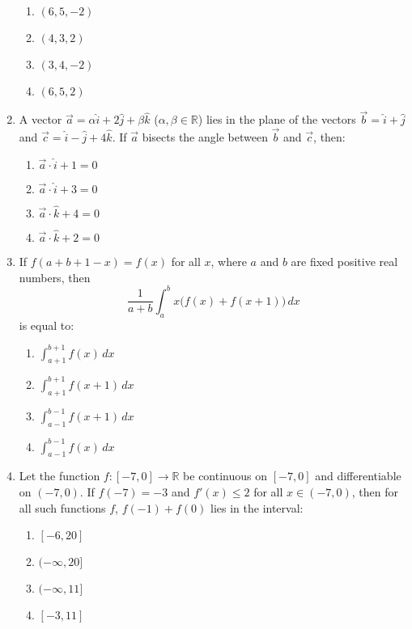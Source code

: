 \documentclass{article}
\begin{document}
\begin{enumerate}
\begin{enumerate}
    \item $(6, 5, -2)$
    \item $(4, 3, 2)$
    \item $(3,4,-2)$
    \item $(6, 5, 2)$
\end{enumerate}

\item A vector $\vec{a} = \alpha \hat{i} + 2\hat{j} + \beta \hat{k}$
($\alpha, \beta \in \mathbb{R}$) lies in the plane of the vectors 
$\vec{b} = \hat{i} + \hat{j}$ and 
$\vec{c} = \hat{i} - \hat{j} + 4\hat{k}$. 
If $\vec{a}$ bisects the angle between $\vec{b}$ and $\vec{c}$, then:

\begin{enumerate}
    \item $\vec{a} \cdot \hat{i} + 1 = 0$
    \item $\vec{a} \cdot \hat{i} + 3 = 0$
    \item $\vec{a} \cdot \hat{k} + 4 = 0$
    \item $\vec{a} \cdot \hat{k} + 2 = 0$
\end{enumerate}


\item If $f(a + b + 1 - x) = f(x)$ for all $x$, where $a$ and $b$ are fixed positive real numbers, then
\[\frac{1}{a + b} \int_a^b x \big(f(x) + f(x+1)\big) \, dx\]
is equal to:

\begin{enumerate}
    \item $\int_{a+1}^{b+1} f(x) \, dx$
    \item $\int_{a+1}^{b+1} f(x+1) \, dx$
    \item $\int_{a-1}^{b-1} f(x+1) \, dx$
    \item $\int_{a-1}^{b-1} f(x) \, dx$
\end{enumerate}

\item Let the function $f : [-7, 0] \to \mathbb{R}$ be continuous on $[-7, 0]$ and differentiable on $(-7, 0)$. If $f(-7) = -3$ and $f'(x) \leq 2$ for all $x \in (-7, 0)$, then for all such functions $f$, $f(-1) + f(0)$ lies in the interval:

\begin{enumerate}
    \item $[-6, 20]$
    \item $(-\infty, 20]$
    \item $(-\infty, 11]$
    \item $[-3, 11]$
\end{enumerate}


\end{enumerate}
\end{document}
